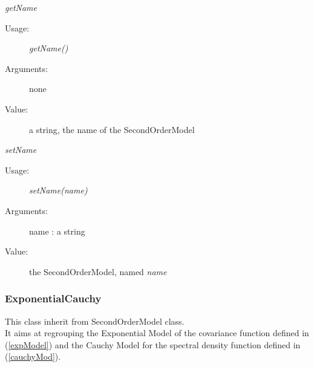 \begin{description}
\begin{description}
\item \textit{getName}
\begin{description}
\item[Usage:] \textit{getName()}
\item[Arguments:] none
\item[Value:] a string, the name of the SecondOrderModel
\end{description}
\bigskip

\item \textit{setName}
\begin{description}
\item[Usage:] \textit{setName(name)}
\item[Arguments:] name : a string
\item[Value:] the SecondOrderModel, named \textit{name}
\end{description}
\bigskip


\end{description}

\end{description}

\newpage
\subsubsection{ExponentialCauchy}

This class inherit from SecondOrderModel class.\\
It aims at regrouping the Exponential Model of the covariance function defined in (\ref{expModel}) and the Cauchy Model for the spectral density function defined in (\ref{cauchyMod}).



